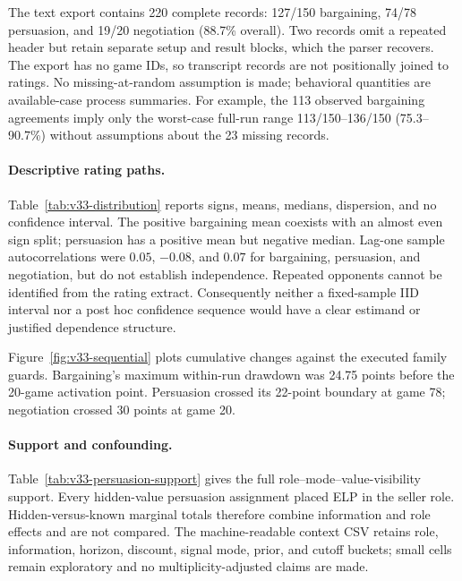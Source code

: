The text export contains 220 complete records: 127/150 bargaining, 74/78
persuasion, and 19/20 negotiation (88.7\% overall). Two records omit a repeated
header but retain separate setup and result blocks, which the parser recovers.
The export has no game IDs, so transcript records are not positionally joined to
ratings. No missing-at-random assumption is made; behavioral quantities are
available-case process summaries.
For example, the 113 observed bargaining agreements imply only the worst-case
full-run range 113/150--136/150 (75.3--90.7\%) without assumptions about the 23
missing records.

\paragraph{Descriptive rating paths.}
Table~\ref{tab:v33-distribution} reports signs, means, medians, dispersion, and
no confidence interval. The positive bargaining mean coexists with an almost
even sign split; persuasion has a positive mean but negative median. Lag-one
sample autocorrelations were $0.05$, $-0.08$, and $0.07$ for bargaining,
persuasion, and negotiation, but do not establish independence. Repeated
opponents cannot be identified from the rating extract. Consequently neither a
fixed-sample IID interval nor a post hoc confidence sequence would have a clear
estimand or justified dependence structure.

Figure~\ref{fig:v33-sequential} plots cumulative changes against the executed
family guards. Bargaining's maximum within-run drawdown was 24.75 points before
the 20-game activation point. Persuasion crossed its 22-point boundary at game
78; negotiation crossed 30 points at game 20.



\paragraph{Support and confounding.}
Table~\ref{tab:v33-persuasion-support} gives the full role--mode--value-visibility
support. Every hidden-value persuasion assignment placed ELP in the seller
role. Hidden-versus-known marginal totals therefore combine information and
role effects and are not compared. The machine-readable context CSV retains
role, information, horizon, discount, signal mode, prior, and cutoff buckets;
small cells remain exploratory and no multiplicity-adjusted claims are made.

